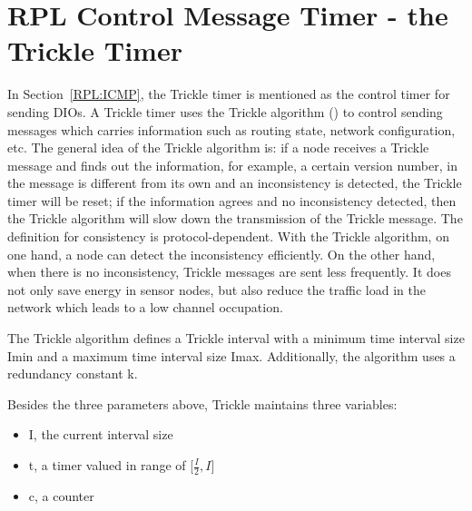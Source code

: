 \section{RPL Control Message Timer - the Trickle Timer}
\label{Trickle}
In Section~\ref{RPL:ICMP}, the Trickle timer is mentioned as the control timer for sending DIOs. A Trickle timer uses the Trickle algorithm (\cite{RFC 6206}) to control sending messages which carries information such as routing state, network configuration, etc. The general idea of the Trickle algorithm is: if a node receives a Trickle message and finds out the information, for example, a certain version number, in the message is different from its own and an inconsistency is detected, the Trickle timer will be reset; if the information agrees and no inconsistency detected, then the Trickle algorithm will slow down the transmission of the Trickle message. The definition for consistency is protocol-dependent. With the Trickle algorithm, on one hand, a node can detect the inconsistency efficiently. On the other hand, when there is no inconsistency, Trickle messages are sent less frequently. It does not only save energy in sensor nodes, but also reduce the traffic load in the network which leads to a low channel occupation. 
\newline

The Trickle algorithm defines a Trickle interval with a minimum time interval size Imin and a maximum time interval size Imax. Additionally, the algorithm uses a redundancy constant k.

Besides the three parameters above, Trickle maintains three variables:
 \begin{itemize}
 \item I, the current interval size
 \newline
 
 \item t, a timer valued in range of [$\frac{I}{2}, I$]
 \newline
 
 \item c, a counter
\newline
\end{itemize}

